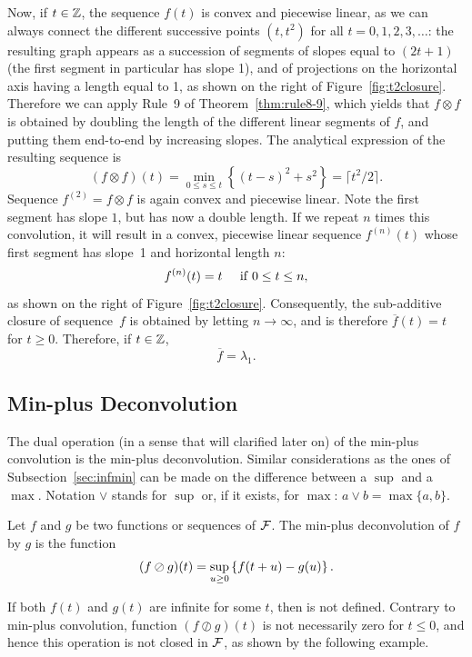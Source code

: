 Now, if  $t \in \mathbb{Z}$, the sequence $f(t)$ is convex and piecewise linear, as we can always connect
 the different successive points $(t, t^2)$ for all $t = 0, 1, 2, 3, \ldots $: the resulting graph
 appears as a succession of segments of slopes equal to $(2t + 1)$ (the first segment in particular has slope 1),
 and of projections on the horizontal axis having a length equal to 1, as shown on the right of
  Figure~\ref{fig:t2closure}.
 Therefore we can apply Rule~9 of Theorem~\ref{thm:rule8-9}, which yields that $f \otimes f$ is
 obtained by doubling the length of the different linear segments of $f$,
 and putting them end-to-end by increasing slopes. The analytical expression of the resulting sequence is
 $$ (f \otimes f)(t) = \min_{0 \leq s \leq t} \left\{ (t-s)^2 + s^2 \right\} = \lceil t^2/2 \rceil . $$
Sequence $f^{(2)} = f \otimes f $ is again convex and piecewise linear. Note the first segment has slope $1$,
but has now a double length. If we repeat $n$ times this convolution, it will result in a convex,
piecewise linear sequence $ f^{(n)}(t) $ whose first segment has slope~1 and horizontal length $n$:
$$ f^{(n)}(t) = t  \;\;\;\;\mathrm{\; if \; } 0 \leq t \leq n, $$
as shown on the right of  Figure~\ref{fig:t2closure}.
Consequently, the sub-additive closure of sequence~$f$ is obtained by letting $n \rightarrow \infty$,
and is therefore $ \overline{f}(t) = t $ for $t \geq 0$.
Therefore, if $t \in \mathbb{Z}$,
$$ \overline{f} = \lambda_1. $$

\subsection{Min-plus Deconvolution}
The dual operation (in a sense that will clarified later on) of the min-plus convolution
is the min-plus deconvolution. Similar considerations as the ones of Subsection~\ref{sec:infmin}
can be made on the difference between a $\sup $ and a $\max$. Notation $\vee$ stands for $\sup$ or,
if it exists, for $\max$: $ a \vee b = \max \{ a, b \}$.
\begin{definition}
Let $f$ and $g$ be two functions or sequences of $\mathcal F$. The min-plus deconvolution of $f$ by $g$
is the function
\begin{equation}
\mylabel{eq:minplusdeconvolution}
(f \oslash g)(t) = \sup_{u \geq 0} \left\{ f(t+u) - g(u) \right\}.
\end{equation}
\end{definition}
If both $f(t)$ and $g(t)$ are infinite for some $t$, then
 is not defined. Contrary to
min-plus convolution, function $(f \oslash g)(t)$ is not
necessarily zero for $t \leq 0$, and hence this operation is not
closed in $\mathcal F$, as shown by the following example. \noindent

